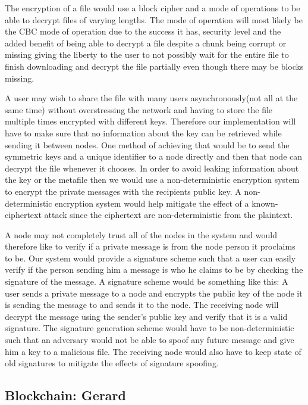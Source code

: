 \documentclass[12pt,a4paper,draft]{article}
\begin{document}
The encryption of a file would use a block cipher and a mode of operations to be able to decrypt files of varying lengths. The mode of operation will most likely be the CBC mode of operation due to the success it has, security level and the added benefit of being able to decrypt a file despite a chunk being corrupt or missing giving the liberty to the user to not possibly wait for the entire file to finish downloading and decrypt the file partially even though there may be blocks missing.

A user may wish to share the file with many users asynchronously(not all at the same time) without overstressing the network and having to store the file multiple times encrypted with different keys. Therefore our implementation will have to make sure that no information about the key can be retrieved while sending it between nodes. One method of achieving that would be to send the symmetric keys and a unique identifier to a node directly and then that node can decrypt the file whenever it chooses. In order to avoid leaking information about the key or the metafile then we would use a non-deterministic encryption system to encrypt the private messages with the recipients public key. A non-deterministic encryption system would help mitigate the effect of a known-ciphertext attack since the ciphertext are non-deterministic from the plaintext.

A node may not completely trust all of the nodes in the system and would therefore like to verify if a private message is from the node person it proclaims to be. Our system would provide a signature scheme such that a user can easily verify if the person sending him a message is who he claims to be by checking the signature of the message. A signature scheme would be something like this: A user sends a private message to a node and encrypts the public key of the node it is sending the message to and sends it to the node. The receiving node will decrypt the message using the sender's public key and verify that it is a valid signature. The signature generation scheme would have to be non-deterministic such that an adversary would not be able to spoof any future message and give him a key to a malicious file. The receiving node would also have to keep state of old signatures to mitigate the effects of signature spoofing.

\subsection{Blockchain: Gerard}
\end{document}
